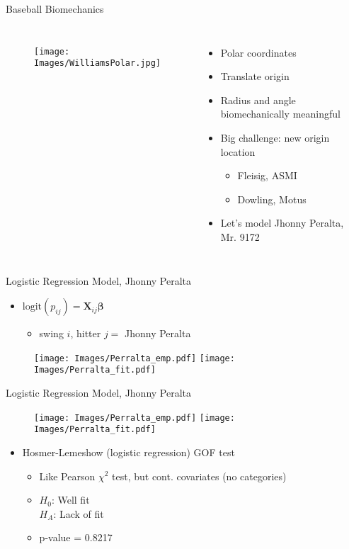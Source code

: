 \documentclass{beamer}
\begin{document}
\begin{frame}{Baseball Biomechanics}{} %

\begin{columns}
  \begin{figure}[H]
	\centering
	\texttt{[image: Images/WilliamsPolar.jpg]}
	\end{figure}
	
\begin{itemize}
\item Polar coordinates
\item Translate origin 
\item Radius and angle biomechanically meaningful
\item Big challenge: new origin location
  \begin{itemize}
  \item Fleisig, ASMI
  \item Dowling, Motus
  \end{itemize}
\item Let's model Jhonny Peralta, Mr. 9172 
\end{itemize}

\end{columns}
\end{frame}

\begin{frame}{Logistic Regression Model, Jhonny Peralta} %
\begin{itemize}
\item $ \text{logit}(p_{ij}) = \pmb{X}_{ij} \pmb{\beta}$
  \begin{itemize}
  \item swing $i$, hitter $j = $ Jhonny Peralta
  \end{itemize}
\end{itemize}
  \begin{figure}[H]
	\centering
	\texttt{[image: Images/Perralta\_emp.pdf]}
	\texttt{[image: Images/Perralta\_fit.pdf]}
	\end{figure}

\end{frame}

\begin{frame}{Logistic Regression Model, Jhonny Peralta} %
  \begin{figure}[H]
	\centering
	\texttt{[image: Images/Perralta\_emp.pdf]}
	\texttt{[image: Images/Perralta\_fit.pdf]}
	\end{figure}
\begin{itemize}
\addtolength{\itemsep}{0.5\baselineskip}
\item Hosmer-Lemeshow (logistic regression) GOF test 
  \begin{itemize}
  \addtolength{\itemsep}{0.5\baselineskip}
  \item Like Pearson $\chi^{2}$ test, but cont. covariates (no categories)
  \item $H_0$: Well fit \\ $H_A$: Lack of fit
  \item p-value = 0.8217
  \end{itemize}
\end{itemize}
\end{frame}
\end{document}
